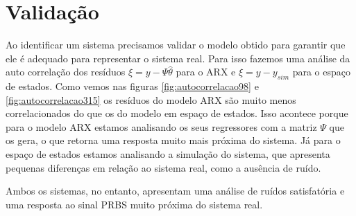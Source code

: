 \section{Validação}\label{s4:val}
Ao identificar um sistema precisamos validar o modelo obtido para garantir que ele é adequado para representar o sistema real. Para isso fazemos uma análise da auto correlação dos resíduos $\xi=y-\Psi \hat{\theta}$ para o ARX e $\xi=y-y_{sim}$ para o espaço de estados. Como vemos nas figuras \ref{fig:autocorrelacao98} e \ref{fig:autocorrelacao315} os resíduos do modelo ARX são muito menos correlacionados do que os do modelo em espaço de estados. Isso acontece porque para o modelo ARX estamos analisando os seus regressores com a matriz $\Psi$ que os gera, o que retorna uma resposta muito mais próxima do sistema. Já para o espaço de estados estamos analisando a simulação do sistema, que apresenta pequenas diferenças em relação ao sistema real, como a ausência de ruído.


Ambos os sistemas, no entanto, apresentam uma análise de ruídos satisfatória e uma resposta ao sinal PRBS muito próxima do sistema real.



